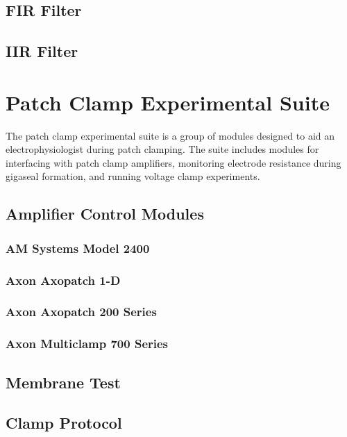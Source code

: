 \subsection{FIR Filter}


\subsection{IIR Filter}


\clearpage
\section{Patch Clamp Experimental Suite}
The patch clamp experimental suite is a group of modules designed to aid an electrophysiologist during patch clamping. The suite includes modules for interfacing with patch clamp amplifiers, monitoring electrode resistance during gigaseal formation, and running voltage clamp experiments.

\subsection{Amplifier Control Modules}


\subsubsection{AM Systems Model 2400}


\subsubsection{Axon Axopatch 1-D}


\subsubsection{Axon Axopatch 200 Series}


\subsubsection{Axon Multiclamp 700 Series}


\subsection{Membrane Test}


\subsection{Clamp Protocol}
